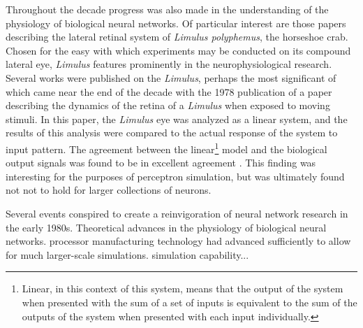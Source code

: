 \documentclass[11pt]{afthesis}
\begin{document}
	Throughout the decade progress was also made in the understanding of the physiology of biological neural networks. Of particular interest are those papers describing the lateral retinal system of \textit{Limulus polyphemus}, the horseshoe crab. Chosen for the easy with which experiments may be conducted on its compound lateral eye, \textit{Limulus} features prominently in the neurophysiological research. Several works were published on the \textit{Limulus}, perhaps the most significant of which came near the end of the decade with the 1978 publication of a paper describing the dynamics of the retina of a \textit{Limulus} when exposed to moving stimuli. In this paper,  the \textit{Limulus} eye was analyzed as a linear system, and the results of this analysis were compared to the actual response of the system to input pattern. The agreement between the linear\footnote{Linear, in this context of this system, means that the output of the system when presented with the sum of a set of inputs is equivalent to the sum of the outputs of the system when presented with each input individually.} model and the biological output signals was found to be in excellent agreement \cite{brodie78limulus}. This finding was interesting for the purposes of perceptron simulation, but was ultimately found not not to hold for larger collections of neurons. %
	
	
	Several events conspired to create a reinvigoration of neural network research in the early 1980s. Theoretical advances in the physiology of biological neural networks. processor manufacturing technology had advanced sufficiently to allow for much larger-scale simulations.  simulation capability...
	
\end{document}
